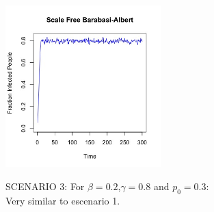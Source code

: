 \documentclass{article}
\begin{document}
\begin{center}
    \includegraphics[width=6cm]{barabasi_albert_2.jpeg}
    
\end{center}

\newpage
\noindent SCENARIO 3: For $\beta = 0.2$,$\gamma = 0.8$ and $p_{0} = 0.3$: \\

\noindent Very similar to escenario 1.\\ 
\end{document}
